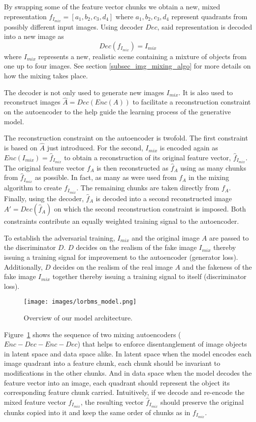 \documentclass[12pt,a4paper]{article}
\begin{document}
By swapping some of the feature vector chunks we obtain a new, mixed representation $f_{I_{mix}} = [a_1, b_2, c_3, d_4]$ where $a_1,b_2,c_3,d_4$ represent quadrants from possibly different input images. Using decoder $Dec$, said representation is decoded into a new image as
\begin{equation} \label{eq:3}
    Dec(f_{I_{mix}}) = I_{mix}
\end{equation}
where $I_{mix}$ represents a new, realistic scene containing a mixture of objects from one up to four images. See section \ref{subsec_img_mixing_algo} for more details on how the mixing takes place.

The decoder is not only used to generate new images $I_{mix}$. It is also used to reconstruct images $\hat{A} = Dec(Enc(A))$ to facilitate a reconstruction constraint on the autoencoder to the help guide the learning process of the generative model.

The reconstruction constraint on the autoencoder is twofold. The first constraint is based on $\hat{A}$ just introduced. For the second, $I_{mix}$ is encoded again as $Enc(I_{mix}) = \hat{f}_{I_{mix}}$ to obtain a reconstruction of its original feature vector, $\hat{f}_{I_{mix}}$. The original feature vector $f_A$ is then reconstructed as $\hat{f}_A$ using as many chunks from $\hat{f}_{I_{mix}}$ as possible. In fact, as many as were used from $f_A$ in the mixing algorithm to create $f_{I_{mix}}$. The remaining chunks are taken directly from $f_A$. Finally, using the decoder, $\hat{f}_A$ is decoded into a second reconstructed image $A' = Dec(\hat{f}_A)$ on which the second reconstruction constraint is imposed. Both constraints contribute an equally weighted training signal to the autoencoder.

To establish the adversarial training, $I_{mix}$ and the original image $A$ are passed to the discriminator $D$. $D$ decides on the realism of the fake image $I_{mix}$ thereby issuing a training signal for improvement to the autoencoder (generator loss). Additionally, $D$ decides on the realism of the real image $A$ and the fakeness of the fake image $I_{mix}$ together thereby issuing a training signal to itself (discriminator loss).

\begin{figure}[ht]
\centering
\texttt{[image: images/lorbms\_model.png]}
\caption{Overview of our model architecture.}
\label{fig:model_arch}
\end{figure}

Figure~\ref{fig:model_arch} shows the sequence of two mixing autoencoders ($Enc-Dec-Enc-Dec$) that helps to enforce disentanglement of image objects in latent space and data space alike. In latent space when the model encodes each image quadrant into a feature chunk, each chunk should be invariant to modifications in the other chunks. And in data space when the model decodes the feature vector into an image, each quadrant should represent the object its corresponding feature chunk carried. Intuitively, if we decode and re-encode the mixed feature vector $f_{I_{mix}}$, the resulting vector $\hat{f}_{I_{mix}}$ should preserve the original chunks copied into it and keep the same order of chunks as in $f_{I_{mix}}$.
\end{document}
